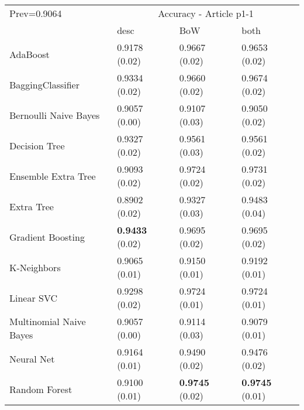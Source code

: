 \begin{tabular}{|l|l|l|l| }
\hline
Prev=0.9064 &  \multicolumn{3}{c|}{Accuracy - Article p1-1} \\
\cline{2-4} & desc & BoW & both \\ \hline
AdaBoost                & 0.9178 (0.02) & 0.9667 (0.02) & 0.9653 (0.02)\\
BaggingClassifier       & 0.9334 (0.02) & 0.9660 (0.02) & 0.9674 (0.02)\\
Bernoulli Naive Bayes   & 0.9057 (0.00) & 0.9107 (0.03) & 0.9050 (0.02)\\
Decision Tree           & 0.9327 (0.02) & 0.9561 (0.03) & 0.9561 (0.02)\\
Ensemble Extra Tree     & 0.9093 (0.02) & 0.9724 (0.02) & 0.9731 (0.02)\\
Extra Tree              & 0.8902 (0.02) & 0.9327 (0.03) & 0.9483 (0.04)\\
Gradient Boosting       & {\bf 0.9433} (0.02) & 0.9695 (0.02) & 0.9695 (0.02)\\
K-Neighbors             & 0.9065 (0.01) & 0.9150 (0.01) & 0.9192 (0.01)\\
Linear SVC              & 0.9298 (0.02) & 0.9724 (0.01) & 0.9724 (0.01)\\
Multinomial Naive Bayes & 0.9057 (0.00) & 0.9114 (0.03) & 0.9079 (0.01)\\
Neural Net              & 0.9164 (0.01) & 0.9490 (0.02) & 0.9476 (0.02)\\
Random Forest           & 0.9100 (0.01) & {\bf 0.9745} (0.02) & {\bf 0.9745} (0.01)\\
\hline
\end{tabular}